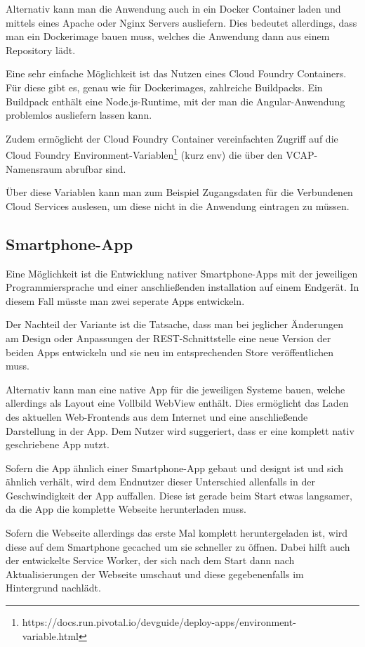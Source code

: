Alternativ kann man die Anwendung auch in ein Docker Container laden und mittels eines Apache oder Nginx Servers
ausliefern. Dies bedeutet allerdings, dass man ein Dockerimage bauen muss, welches die Anwendung dann aus einem
Repository lädt.

Eine sehr einfache Möglichkeit ist das Nutzen eines Cloud Foundry Containers. Für diese gibt es, genau wie für
Dockerimages, zahlreiche Buildpacks. Ein Buildpack enthält eine Node.js-Runtime, mit der man die Angular-Anwendung
problemlos ausliefern lassen kann.

Zudem ermöglicht der Cloud Foundry Container vereinfachten Zugriff auf die Cloud Foundry
Environment-Variablen\footnote{https://docs.run.pivotal.io/devguide/deploy-apps/environment-variable.html} (kurz env)
die über den VCAP-Namensraum abrufbar sind.

Über diese Variablen kann man zum Beispiel Zugangsdaten für die Verbundenen Cloud Services auslesen, um diese nicht in
die Anwendung eintragen zu müssen.

\subsection{Smartphone-App}
Eine Möglichkeit ist die Entwicklung nativer Smartphone-Apps mit der jeweiligen Programmiersprache und einer
anschließenden installation auf einem Endgerät. In diesem Fall müsste man zwei seperate Apps entwickeln.

Der Nachteil der Variante ist die Tatsache, dass man bei jeglicher Änderungen am Design oder Anpassungen der
REST-Schnittstelle eine neue Version der beiden Apps entwickeln und sie neu im entsprechenden Store veröffentlichen
muss.

Alternativ kann man eine native App für die jeweiligen Systeme bauen, welche allerdings als Layout eine Vollbild WebView
enthält. Dies ermöglicht das Laden des aktuellen Web-Frontends aus dem Internet und eine anschließende Darstellung in
der App. Dem Nutzer wird suggeriert, dass er eine komplett nativ geschriebene App nutzt.

Sofern die App ähnlich einer Smartphone-App gebaut und designt ist und sich ähnlich verhält, wird dem Endnutzer dieser
Unterschied allenfalls in der Geschwindigkeit der App auffallen. Diese ist gerade beim Start etwas langsamer, da die
App die komplette Webseite herunterladen muss.

Sofern die Webseite allerdings das erste Mal komplett heruntergeladen ist, wird diese auf dem Smartphone gecached um sie
schneller zu öffnen. Dabei hilft auch der entwickelte Service Worker, der sich nach dem Start dann nach Aktualisierungen
der Webseite umschaut und diese gegebenenfalls im Hintergrund nachlädt.

